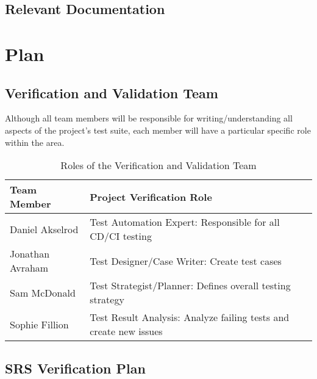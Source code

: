 \documentclass[12pt, titlepage]{article}
\begin{document}
\subsection{Relevant Documentation}


\citet{SRS}


\section{Plan}

\subsection{Verification and Validation Team}

Although all team members will be responsible for writing/understanding all aspects of the project's test suite, each member will have a particular specific role within the area.

\begin{table}[h]
  \centering
  \begin{tabular}{|l|l|}
    \hline
    \textbf{Team Member} & \textbf{Project Verification Role} \\
    \hline
    Daniel Akselrod & Test Automation Expert: Responsible for all CD/CI testing \\
    \hline
    Jonathan Avraham & Test Designer/Case Writer: Create test cases \\
    \hline
    Sam McDonald & Test Strategist/Planner: Defines overall testing strategy \\
    \hline
    Sophie Fillion & Test Result Analysis: Analyze failing tests and create new issues \\
    \hline
  \end{tabular}
  \caption{Roles of the Verification and Validation Team}
  \label{tab:verification_validation_team}
\end{table}

\subsection{SRS Verification Plan}
\end{document}
